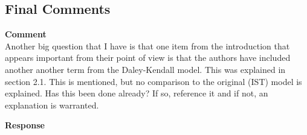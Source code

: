 \subsection{Final Comments}

\textbf{Comment} \\
Another big question that I have is that one item from the introduction that appears important from their point of view is that the authors have included another another term from the Daley-Kendall model.
This was explained in section 2.1.
This is mentioned, but no comparison to the original (IST) model is explained. Has this been done already?
If so, reference it and if not, an explanation is warranted.

\textbf{Response} \\
